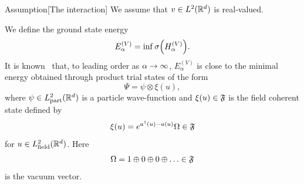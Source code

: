 \documentclass[10pt]{amsart}
\theoremstyle{definition}\newtheorem{defi}[theo]{Definition}\newtheorem{rema}[theo]{Remark}\newtheorem{exam}[theo]{Example}\newtheorem{exem}[theo]{Example}\newtheorem{nota}[theo]{Notation}
\DeclareMathOperator{\partt}{part}
\DeclareMathOperator{\field}{field}
\newcommand{\R}{\mathbb{R}}
\newcommand{\gF}{\mathfrak{F}}
\newcommand{\1}{\mathds{1}}
\let\oldin\in
\renewcommand{\in}{\mathchoice{\oldin}{\oldin}{\,\oldin\,}{\,\oldin\,}}
\renewcommand*{\to}{\mathchoice{\longrightarrow}{\rightarrow}{\rightarrow}{\rightarrow}}
\let\originalleft\left
\let\originalright\right
\renewcommand{\left}{\mathopen{}\mathclose\bgroup\originalleft}
\renewcommand{\right}{\aftergroup\egroup\originalright}
\begin{document}
\begin{enonce}{Assumption}[{The interaction}]\label{assum:int}
We assume that $v\in L^2(\R^d)$ is real-valued.
\end{enonce}


We define the ground state energy
\begin{equation}
E^{(V)}_\alpha=\inf \sigma\left(H^{(V)}_\alpha\right).
\end{equation}
It is known~\cite{DonVar-83,LieTho-97,MiySpo-07} that, to leading order as $\alpha\to\infty$, $E^{(V)}_\alpha$ is close to the minimal energy obtained through product trial states of the form
\begin{equation*}
\Psi=\psi\otimes \xi(u),
\end{equation*}
where $\psi\in L^2_{\partt}(\R^d)$ is a particle wave-function and $\xi(u)\in \gF$ is the field coherent state defined by
\begin{equation}\label{eq:coherent_state}
\xi(u)=e^{a^\dagger(u)-a(u)}\Omega \in \gF
\end{equation}
for $u\in L^2_{\field}(\R^d)$. Here
\begin{equation*}
\Omega=1\oplus0\oplus0\oplus\dots\in\gF
\end{equation*}
is the vacuum vector.
\end{document}
